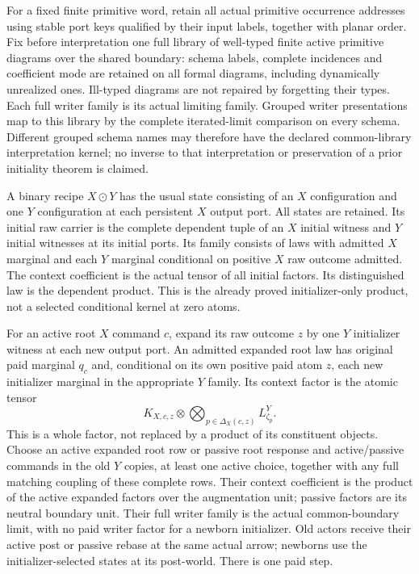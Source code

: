 \documentclass[11pt]{article}
\begin{document}
For a fixed finite primitive word, retain all actual primitive occurrence addresses using stable port keys qualified by their input labels, together with planar order. Fix before interpretation one full library of well-typed finite active primitive diagrams over the shared boundary: schema labels, complete incidences and coefficient mode are retained on all formal diagrams, including dynamically unrealized ones. Ill-typed diagrams are not repaired by forgetting their types. Each full writer family is its actual limiting family. Grouped writer presentations map to this library by the complete iterated-limit comparison on every schema. Different grouped schema names may therefore have the declared common-library interpretation kernel; no inverse to that interpretation or preservation of a prior initiality theorem is claimed.

A binary recipe $X\odot Y$ has the usual state consisting of an $X$ configuration and one $Y$ configuration at each persistent $X$ output port. All states are retained. Its initial raw carrier is the complete dependent tuple of an $X$ initial witness and $Y$ initial witnesses at its initial ports. Its family consists of laws with admitted $X$ marginal and each $Y$ marginal conditional on positive $X$ raw outcome admitted. The context coefficient is the actual tensor of all initial factors. Its distinguished law is the dependent product. This is the already proved initializer-only product, not a selected conditional kernel at zero atoms.

For an active root $X$ command $c$, expand its raw outcome $z$ by one $Y$ initializer witness at each new output port. An admitted expanded root law has original paid marginal $q_c$ and, conditional on its own positive paid atom $z$, each new initializer marginal in the appropriate $Y$ family. Its context factor is the atomic tensor
\[
 K_{X,c,z}\otimes\bigotimes_{p\in\Delta_X(c,z)}L^Y_{\zeta_p}.   \tag{1}
\]
This is a whole factor, not replaced by a product of its constituent objects. Choose an active expanded root row or passive root response and active/passive commands in the old $Y$ copies, at least one active choice, together with any full matching coupling of these complete rows. Their context coefficient is the product of the active expanded factors over the augmentation unit; passive factors are its neutral boundary unit. Their full writer family is the actual common-boundary limit, with no paid writer factor for a newborn initializer. Old actors receive their active post or passive rebase at the same actual arrow; newborns use the initializer-selected states at its post-world. There is one paid step.
\end{document}
